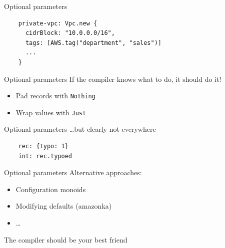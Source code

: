 \documentclass[aspectratio=169,20pt]{beamer}
\newcommand{\vspaced}{
    \vspace{5mm}
}
\newcommand{\chapterslide}[1]{
    {
        \begin{frame}[plain]
        \begin{center}
        \large{#1}
        \end{center}
        \end{frame}
    }
}
\begin{document}
\begin{frame}[fragile]{Optional parameters}
    \begin{lstlisting}
    private-vpc: Vpc.new {
      cidrBlock: "10.0.0.0/16",
      tags: [AWS.tag("department", "sales")]
      ...
    }
    \end{lstlisting}
\end{frame}

\begin{frame}[fragile]{Optional parameters}
    If the compiler knows what to do, it should do it! \\
    \vspaced
    \begin{itemize}
    \item Pad records with \texttt{Nothing}
    \item Wrap values with \texttt{Just}
    \end{itemize}
\end{frame}

\begin{frame}[fragile]{Optional parameters}
    \ldots but clearly not everywhere
    \vspaced
    \begin{lstlisting}
    rec: {typo: 1}
    int: rec.typoed
    \end{lstlisting}
\end{frame}

\begin{frame}[fragile]{Optional parameters}
    Alternative approaches: \\
    \vspaced
    \begin{itemize}
    \item Configuration monoids
    \item Modifying defaults (amazonka)
    \item \ldots
    \end{itemize}
\end{frame}

\chapterslide{The compiler should be your best friend}
\end{document}
